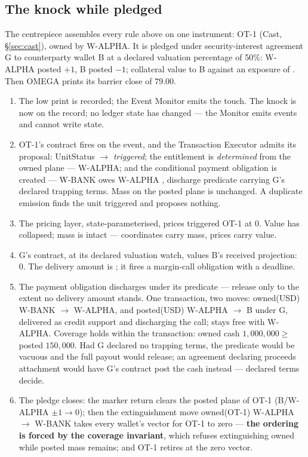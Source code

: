 \subsection{The knock while pledged}\label{sec:knockpledged}

The centrepiece assembles every rule above on one instrument: OT-1 (Cast,
\S\ref{sec:cast}), owned by W-ALPHA. It is pledged under security-interest
agreement G to counterparty wallet B at a declared valuation percentage of
50\%: W-ALPHA posted $+1$, B posted $-1$; collateral value to B
 against an exposure of . Then OMEGA prints its
barrier close of $79.00$.

\begin{enumerate}[label=\textbf{\arabic*.},nosep,itemsep=2pt]
\item The low print is recorded; the Event Monitor emits the touch. The knock
is now on the record; no ledger state has changed --- the Monitor emits
events and cannot write state.
\item OT-1's contract fires on the event, and the Transaction Executor admits
its proposal: UnitStatus $\to$ \emph{triggered}; the entitlement is
\emph{determined} from the owned plane --- W-ALPHA; and the conditional
payment obligation is created --- W-BANK owes W-ALPHA ,
discharge predicate carrying G's declared trapping terms. Mass on the posted
plane is unchanged. A duplicate emission finds the unit triggered and proposes
nothing.
\item The pricing layer, state-parameterised, prices triggered OT-1 at 0.
Value has collapsed; mass is intact --- coordinates carry mass, prices carry
value.
\item G's contract, at its declared valuation watch, values B's received
projection: 0. The delivery amount is ; it fires a margin-call
obligation with a deadline.
\item The payment obligation discharges under its predicate --- release only
to the extent no delivery amount stands. One transaction, two moves:
owned(USD)  W-BANK $\to$ W-ALPHA, and posted(USD)
 W-ALPHA $\to$ B under G, delivered as credit support and
discharging the call;  stays free with W-ALPHA. Coverage holds
within the transaction: owned cash $1{,}000{,}000 \ge$ posted $150{,}000$.
Had G declared no trapping terms, the predicate would be vacuous and the full
payout would release; an agreement declaring proceeds attachment would have
G's contract post the cash instead --- declared terms decide.
\item The pledge closes: the marker return clears the posted plane of OT-1
(B/W-ALPHA $\pm 1 \to 0$); then the extinguishment move owned(OT-1) W-ALPHA
$\to$ W-BANK takes every wallet's vector for OT-1 to zero --- \textbf{the
ordering is forced by the coverage invariant}, which refuses extinguishing
owned while posted mass remains; and OT-1 retires at the zero vector.
\end{enumerate}

